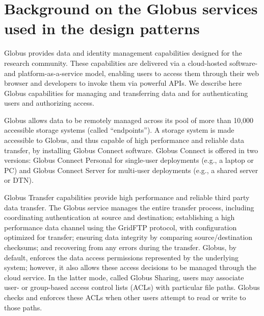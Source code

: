 \documentclass[10pt]{article}
\begin{document}
%




\section*{Background on the Globus services used in the design patterns}
Globus provides data and identity management capabilities designed for the research community. 
These capabilities are delivered via a cloud-hosted software- and platform-as-a-service model, 
enabling users to access them through their web browser and
developers to invoke them via powerful APIs. 
We describe here Globus capabilities for managing and transferring data and for authenticating users and authorizing access.

Globus allows data to be remotely managed across its pool of more than 10,000 accessible storage systems (called ``endpoints''). 
A storage system is made accessible to Globus, and thus capable of high performance and reliable data transfer, by installing Globus Connect software. 
Globus Connect is offered in two versions: 
Globus Connect Personal for single-user deployments (e.g., a laptop or PC) and Globus Connect Server for multi-user
deployments (e.g., a shared server or DTN). 

Globus Transfer capabilities provide high performance and reliable third party data transfer. 
The Globus service manages the entire transfer process, including coordinating authentication at source and destination; establishing a high performance data channel using  the GridFTP protocol, with configuration optimized for transfer; ensuring data integrity by comparing source/destination checksums; and recovering from any errors during the transfer.  Globus, by default, enforces the data access permissions represented
by the underlying system; however, it also allows these access decisions to be managed through the cloud service. In the latter mode, called Globus Sharing, users may associate user- or group-based access control lists (ACLs) with particular file paths. Globus checks and enforces these ACLs when other users attempt to read or write to those paths.
\end{document}
